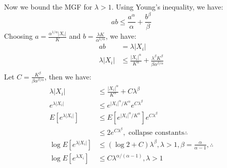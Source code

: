 \documentclass[11pt,a4paper,margin=1in]{article}
\begin{document}
\noindent
Now we bound the MGF for $\lambda > 1$. Using Young's inequality, we have:
\[
    ab \leq \frac{a^\alpha}{\alpha} + \frac{b^\beta}{\beta}
\]
Choosing $a = \frac{\alpha^{1/\alpha}|X_i|}{K}$ and $b = \frac{\lambda K}{\alpha^{1/\alpha}}$, 
we have:
\begin{align*}
    ab &= \lambda |X_i| \\
    \lambda |X_i| &\leq \frac{|X_i|^\alpha}{K^\alpha} + \frac{\lambda^\beta K^\beta}{\beta \alpha^{\beta/\alpha}} \\
\end{align*}
Let $C = \frac{K^\beta}{\beta \alpha^{\beta/\alpha}}$, then we have:
\begin{align*}
    \lambda |X_i| &\leq \frac{|X_i|^\alpha}{K^\alpha} + C \lambda^\beta \\
    e^{\lambda |X_i|} &\leq e^{|X_i|^\alpha/K^\alpha} e^{C \lambda^\beta} \\
    E[e^{\lambda |X_i|}] &\leq E[e^{|X_i|^\alpha/K^\alpha}] e^{C \lambda^\beta} \\
    &\leq 2 e^{C \lambda^\beta}, \text{ collapse constants}\therefore \\
    \log E[e^{\lambda |X_i|}] &\leq (\log 2 + C) \lambda^\beta, \lambda > 1, \beta = \frac{\alpha}{\alpha - 1}, \therefore \\
    \log E[e^{\lambda X_i}] &\leq C \lambda^{\alpha/(\alpha - 1)}, \lambda > 1 \\
\end{align*}
\end{document}

